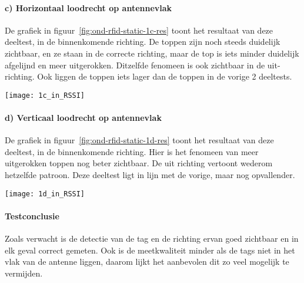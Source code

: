 \paragraph{c) Horizontaal loodrecht op antennevlak}
\begin{minipage}{0.55\textwidth}
De grafiek in figuur~\ref{fig:ond-rfid-static-1c-res} toont het resultaat van deze deeltest, in de binnenkomende richting. De toppen zijn noch steeds duidelijk zichtbaar, en ze staan in de correcte richting, maar de top is iets minder duidelijk afgelijnd en meer uitgerokken. Ditzelfde fenomeen is ook zichtbaar in de uit-richting. Ook liggen de toppen iets lager dan de toppen in de vorige 2 deeltests.
\end{minipage}
\hfill
\begin{minipage}{0.42\textwidth}
	\texttt{[image: 1c\_in\_RSSI]}
	\label{fig:ond-rfid-static-1c-res}
\end{minipage}

\paragraph{d) Verticaal loodrecht op antennevlak}
\begin{minipage}{0.55\textwidth}
De grafiek in figuur~\ref{fig:ond-rfid-static-1d-res} toont het resultaat van deze deeltest, in de binnenkomende richting. Hier is het fenomeen van meer uitgerokken toppen nog beter zichtbaar. De uit richting vertoont wederom hetzelfde patroon. Deze deeltest ligt in lijn met de vorige, maar nog opvallender.
\end{minipage}
\hfill
\begin{minipage}{0.42\textwidth}
	\texttt{[image: 1d\_in\_RSSI]}
	\label{fig:ond-rfid-static-1d-res}
\end{minipage}

\paragraph{Testconclusie}
Zoals verwacht is de detectie van de tag en de richting ervan goed zichtbaar en in elk geval correct gemeten. Ook is de meetkwaliteit minder als de tags niet in het vlak van de antenne liggen, daarom lijkt het aanbevolen dit zo veel mogelijk te vermijden.

